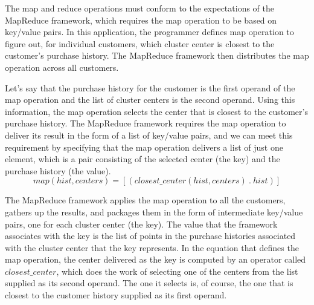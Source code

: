 The map and reduce operations
must conform to the expectations of the MapReduce framework,
which requires the map operation to be based on
key/value pairs. In this application,
the programmer defines map operation
to figure out, for individual customers, which cluster center
is closest to the customer's purchase history.
The MapReduce framework then distributes the map operation
across all customers.

Let's say that the purchase history for the customer is the first operand
of the map operation and the list of cluster centers is the second operand.
Using this information, the map operation selects the center that is closest
to the customer's purchase history. The MapReduce framework requires the map
operation to deliver its result in the form of a list of key/value pairs,
and we can meet this requirement by specifying that the map operation
delivers a list of just one element, which is a pair consisting of
the selected center (the key) and the purchase history (the value).
\begin{displaymath}
map(hist, centers) = [ ( closest\_center(hist, centers) ~.~ hist ) ]
\end{displaymath}

The MapReduce framework applies the map operation to all the customers,
gathers up the results, and packages them in the form of
intermediate key/value pairs, one for each cluster center (the key).
The value that the framework associates with the key is the list of
points in the purchase histories associated with the cluster center that
the key represents.
In the equation that defines the map operation,
the center delivered as the key is computed by an operator
called $closest\_center$, which does the work of selecting one
of the centers from the list supplied as its second operand.
The one it selects is, of course, the one that is closest to
the customer history supplied as its first operand.

